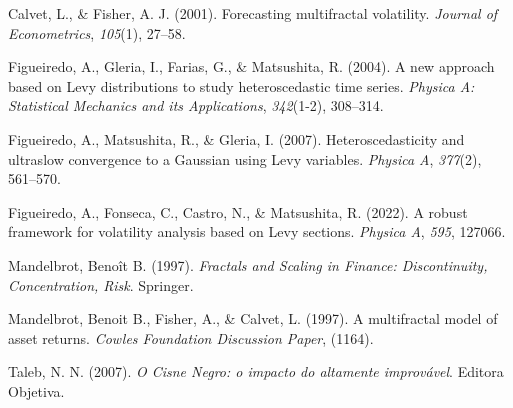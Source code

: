 \documentclass[
]{agujournal2019}
\newlength{\cslhangindent}
\newenvironment{CSLReferences}[2] %
 {\begin{list}{}{%
  \setlength{\itemindent}{0pt}
  \setlength{\leftmargin}{0pt}
  \setlength{\parsep}{0pt}
  \ifodd #1
   \setlength{\leftmargin}{\cslhangindent}
   \setlength{\itemindent}{-1\cslhangindent}
  \fi
  \setlength{\itemsep}{#2\baselineskip}}}
 {\end{list}}
\begin{document}
\label{refs}
\begin{CSLReferences}{1}{0}
Calvet, L., \& Fisher, A. J. (2001). Forecasting multifractal
volatility. \emph{Journal of Econometrics}, \emph{105}(1), 27--58.

Figueiredo, A., Gleria, I., Farias, G., \& Matsushita, R. (2004). A new
approach based on Levy distributions to study heteroscedastic time
series. \emph{Physica A: Statistical Mechanics and its Applications},
\emph{342}(1-2), 308--314.

Figueiredo, A., Matsushita, R., \& Gleria, I. (2007). Heteroscedasticity
and ultraslow convergence to a Gaussian using Levy variables.
\emph{Physica A}, \emph{377}(2), 561--570.

Figueiredo, A., Fonseca, C., Castro, N., \& Matsushita, R. (2022). A
robust framework for volatility analysis based on Levy sections.
\emph{Physica A}, \emph{595}, 127066.

Mandelbrot, Benoît B. (1997). \emph{Fractals and Scaling in Finance:
Discontinuity, Concentration, Risk}. Springer.

Mandelbrot, Benoit B., Fisher, A., \& Calvet, L. (1997). A multifractal
model of asset returns. \emph{Cowles Foundation Discussion Paper},
(1164).

Taleb, N. N. (2007). \emph{O Cisne Negro: o impacto do altamente
improvável}. Editora Objetiva.

\end{CSLReferences}
\end{document}
